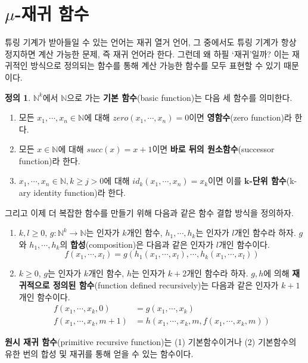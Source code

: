 \documentclass[b5paper, 10pt]{book}
\theoremstyle{definition}
\newtheorem{defn}{정의}[chapter]
\begin{document}
\section{$\mu$-재귀 함수} \label{mu-recursive}
튜링 기계가 받아들일 수 있는 언어는 재귀 열거 언어, 그 중에서도 튜링 기계가 항상 정지하면 계산 가능한 문제, 즉 재귀 언어라 한다. 
그런데 왜 하필 `재귀'일까? 이는 재귀적인 방식으로 정의되는 함수를 통해 계산 가능한 함수를 모두 표현할 수 있기
때문이다.  
\begin{defn} \label{primitive recursive definition}
    $\mathbb{N}^k$에서 $\mathbb{N}$으로 가는 \textbf{기본 함수}(basic function)는 다음 세 함수를 의미한다.
    \begin{enumerate}
        \item 모든 $x_1, \cdots, x_n \in \mathbb{N}$에 대해 
        $zero(x_1, \cdots, x_n) = 0$이면 \textbf{영함수}(zero function)라 한다.
        \item 모든 $x \in \mathbb{N}$에 대해 $succ(x) = x+1$이면 \textbf{바로 뒤의 원소함수}(successor
        function)라 한다. 
        \item $x_1, \cdots, x_n \in \mathbb{N}, k \ge j > 0$에 대해 $id_k(x_1, \cdots, x_n) = x_k$이면 이를 
        $\mathbf{k}$\textbf{-단위 함수}(k-ary identity function)라 한다. 
    \end{enumerate}
    그리고 이제 더 복잡한 함수를 만들기 위해 다음과 같은 함수 결합 방식을 정의하자.
    \begin{enumerate}
        \item $k, l \ge 0$, $g: \mathbb{N}^k \rightarrow \mathbb{N}$는 인자가 $k$개인 함수, $h_1, \cdots, h_k$는
        인자가 $l$개인 함수라 하자. $g$와 $h_1, \cdots, h_k$의 \textbf{합성}(composition)은 
        다음과 같은 인자가 $l$개인 함수이다.
        $$f(x_1, \cdots , x_l) = g(h_1(x_1, \cdots , x_l), \cdots, h_k(x_1, \cdots, x_l))$$
        \item $k \ge 0$, $g$는 인자가 $k$개인 함수, $h$는 인자가 $k+2$개인 함수라 하자. $g, h$에 의해 
        \textbf{재귀적으로 정의된 함수}(function defined recursively)는 다음과 같은 인자가 $k+1$개인 함수이다.
        \begin{align*}
            f(x_1, \cdots, x_k, 0) &= g(x_1, \cdots, x_k) \\ 
            f(x_1, \cdots, x_k, m+1) &= h(x_1, \cdots, x_k, m, f(x_1, \cdots, x_k, m))
        \end{align*} 
    \end{enumerate}
    \textbf{원시 재귀 함수}(primitive recursive function)는 (1) 기본함수이거나 (2) 기본함수의 
    유한 번의 합성 및 재귀를 통해 얻을 수 있는 함수이다.
\end{defn}
\end{document}
